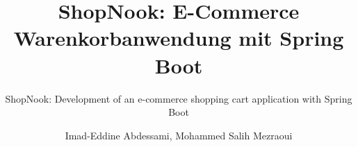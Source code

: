 \documentclass[envcountsame, envcountchap, deutsch]{i-studis}
\begin{document}
\title{ShopNook: E-Commerce Warenkorbanwendung mit Spring Boot}
\subtitle{ShopNook: Development of an e-commerce shopping cart application with Spring Boot}

\author{Imad-Eddine Abdessami, Mohammed Salih Mezraoui}


\address{Trier}


\mytitlepage

\frontmatter
\tableofcontents										%
\listoffigures											%


\mainmatter







\backmatter
\printindex												%


\begin{appendix}
\end{appendix}
\end{document}
